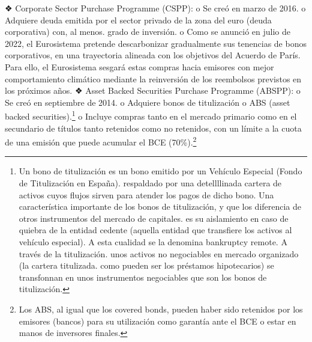 \documentclass[10pt,a4paper]{article}
\begin{document}
{❖ Corporate Sector Purchase Programme (CSPP):
o Se creó en marzo de 2016. o Adquiere deuda emitida por el sector privado de la zona del euro (deuda corporativa) con, al menos. grado de inversión. o Como se anunció en julio de 2022, el Eurosistema pretende descarbonizar gradualmente sus tenencias de bonos corporativos, en una trayectoria alineada con los objetivos del Acuerdo de París. Para ello, el Eurosistema sesgará estas compras hacia emisores con mejor comportamiento climático mediante la reinversión de los reembolsos previstos en los próximos años.
❖ Asset Backed Securities Purchase Programme (ABSPP):
o Se creó en septiembre de 2014. o Adquiere bonos de titulización o ABS (asset backed securities).\footnote{%
    Un bono de titulización es un bono emitido por un Vehículo Especial (Fondo de Titulización en España). respaldado por una detellllinada cartera de activos cuyos flujos sirven para atender los pagos de dicho bono. Una característica importante de los bonos de titulización, y que los diferencia de otros instrumentos del mercado de capitales. es su aislamiento en caso de quiebra de la entidad cedente (aquella entidad que transfiere los activos al vehículo especial). A esta cualidad se la denomina bankruptcy remote. A través de la titulización. unos activos no negociables en mercado organizado (la cartera titulizada. como pueden ser los préstamos hipotecarios) se transfonnan en unos instrumentos negociables que son los bonos de titulización.
} o Incluye compras tanto en el mercado primario como en el secundario de títulos tanto retenidos como no retenidos, con un límite a la cuota de una emisión que puede acumular el BCE (70\%).\footnote{%
    Los ABS, al igual que los covered bonds, pueden haber sido retenidos por los emisores (bancos) para su utilización como garantía ante el BCE o estar en manos de inversores finales.
}

}
\end{document}
